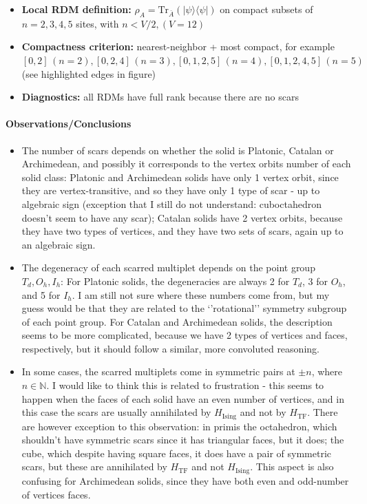 \documentclass[11pt,a4paper]{article}
\newcommand{\Hising}{H_{\mathrm{Ising}}}
\newcommand{\Htf}{H_{\mathrm{TF}}}
\begin{document}
\begin{itemize}[leftmargin=1.5em]
  \item \textbf{Local RDM definition:} $\rho_A=\mathrm{Tr}_{\bar A}(|\psi\rangle\langle\psi|)$ on compact subsets of $n=2,3,4,5$ sites, with $n < V/2, (V=12)$
  \item \textbf{Compactness criterion:} nearest-neighbor + most compact, for example $[0,2] \, (n = 2), [0,2,4] \, (n = 3), [0,1,2,5] \,  (n = 4), [0,1,2,4,5] \, (n = 5)$ (see highlighted edges in figure)
  \item \textbf{Diagnostics:} all RDMs have full rank because there are no scars
\end{itemize}


\paragraph*{Observations/Conclusions}

\begin{itemize}
\item The number of scars depends on whether the solid is Platonic, Catalan or Archimedean, and possibly it corresponds to the vertex orbits number of each solid class: Platonic and Archimedean solids have only 1 vertex orbit, since they are vertex-transitive, and so they have only 1 type of scar - up to algebraic sign (exception that I still do not understand: cuboctahedron doesn't seem to have any scar); Catalan solids have 2 vertex orbits, because they have two types of vertices, and they have two sets of scars, again up to an algebraic sign.\\
\item The degeneracy of each scarred multiplet depends on the point group $T_d, O_h, I_h$: For Platonic solids, the degeneracies are always 2 for $T_d$, 3 for $O_h$, and 5 for $I_h$. I am still not sure where these numbers come from, but my guess would be that they are related to the `'rotational'' symmetry subgroup of each point group. For Catalan and Archimedean solids, the description seems to be more complicated, because we have 2 types of vertices and faces, respectively, but it should follow a similar, more convoluted reasoning.
\item In some cases, the scarred multiplets come in symmetric pairs at $\pm n$, where $n\in\mathbb{N}$. I would like to think this is related to frustration - this seems to happen when the faces of each solid have an even number of vertices, and in this case the scars are usually annihilated by $\Hising$ and not by $\Htf$. There are however exception to this observation: in primis the octahedron, which shouldn't have symmetric scars since it has triangular faces, but it does; the cube, which despite having square faces, it does have a pair of symmetric scars, but these are annihilated by $\Htf$ and not  $\Hising$. This aspect is also confusing for Archimedean solids, since they have both even and odd-number of vertices faces.
\end{itemize}
\end{document}
